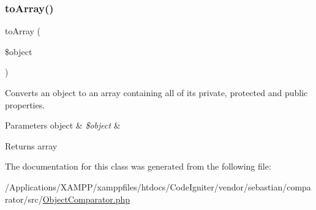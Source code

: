 \subsubsection{\texorpdfstring{to\+Array()}{toArray()}}
{\footnotesize\ttfamily to\+Array (\begin{DoxyParamCaption}\item[{}]{\$object }\end{DoxyParamCaption})\hspace{0.3cm}{\ttfamily [protected]}}

Converts an object to an array containing all of its private, protected and public properties.


\begin{DoxyParams}[1]{Parameters}
object & {\em \$object} & \\
\hline
\end{DoxyParams}
\begin{DoxyReturn}{Returns}
array 
\end{DoxyReturn}


The documentation for this class was generated from the following file\+:\begin{DoxyCompactItemize}
\item 
/\+Applications/\+X\+A\+M\+P\+P/xamppfiles/htdocs/\+Code\+Igniter/vendor/sebastian/comparator/src/\mbox{\hyperlink{_object_comparator_8php}{Object\+Comparator.\+php}}\end{DoxyCompactItemize}
